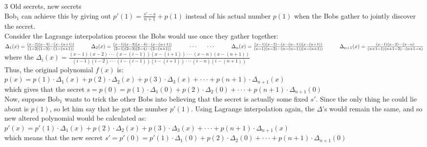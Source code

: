 \documentclass{article}
\begin{document}
{\Large 3 Old secrets, new secrets} \\[.5cm]
Bob$_1$ can achieve this by giving out {\color{red} $p'(1) = \frac{s'-s}{n+1} + p(1)$} instead of his actual number $p(1)$ when the Bobs gather to jointly discover the secret. \\

Consider the Lagrange interpolation process the Bobs would use once they gather together: \\

\indent\indent $\Delta_1(x) = \frac{(x-2)(x-3)\cdot\cdot\cdot(x-(n+1))}{(1-2)(1-3)\cdot\cdot\cdot (1-(n+1))} \\[.1cm]
\indent\indent \Delta_2(x) = \frac{(x-1)(x-3)(x-4)\cdot\cdot\cdot(x-(n+1))}{(2-1)(2-3)(2-4)\cdot\cdot\cdot (2-(n+1))} \\[.3cm]
\indent\indent\cdot\cdot\cdot\indent\cdot\cdot\cdot \\[.3cm]
\indent\indent \Delta_n(x) = \frac{(x-1)(x-2)\cdot\cdot\cdot(x-(n-1))(x-(n+1))}
{(n-1)(n-2)\cdot\cdot\cdot (n-(n-1))(n-(n+1))} \\[.1cm]
\indent\indent \Delta_{n+1}(x) = \frac{(x-1)(x-2)\cdot\cdot\cdot(x-n)}
{(n+1-1)(n+1-2)\cdot\cdot\cdot (n+1-n)} \\[.3cm] $
where the $\Delta_i(x) = \frac{(x-1)(x-2)\cdot\cdot\cdot
(x-(i-1))(x-(i+1))\cdot\cdot\cdot (x-n)(x-(n+1))}
{(i-1)(i-2)\cdot\cdot\cdot (i-(i-1))(i-(i+1))\cdot\cdot\cdot (i-n)(i-(n+1))} $ \\

Thus, the original polynomial $f(x)$ is: \\[.3cm]
\indent\indent $p(x) = p(1)\cdot\Delta_1(x) + p(2)\cdot\Delta_2(x) + p(3)\cdot\Delta_3(x) + \cdot\cdot\cdot + p(n+1)\cdot\Delta_{n+1}(x)$ \\[.3cm]
which gives that the secret $s = p(0) = p(1)\cdot\Delta_1(0) + p(2)\cdot\Delta_2(0) + \cdot\cdot\cdot + p(n+1)\cdot\Delta_{n+1}(0)$ \\

Now, suppose Bob$_1$ wants to trick the other Bobs into believing that the secret is actually some fixed $s'.$ Since the only thing he could lie about is $p(1)$, so let him say that he got the number $p'(1).$
Using Lagrange interpolation again, the $\Delta$'s would remain the same, and so new altered polynomial would be calculated as: \\[.3cm]
\indent\indent $p'(x) = p'(1)\cdot\Delta_1(x) + p(2)\cdot\Delta_2(x) + p(3)\cdot\Delta_3(x) + \cdot\cdot\cdot + p(n+1)\cdot\Delta_{n+1}(x)$ \\[.3cm]
which means that the new secret $s' = p'(0) = p'(1)\cdot\Delta_1(0) + p(2)\cdot\Delta_2(0) + \cdot\cdot\cdot + p(n+1)\cdot\Delta_{n+1}(0)$ \\
\end{document}
